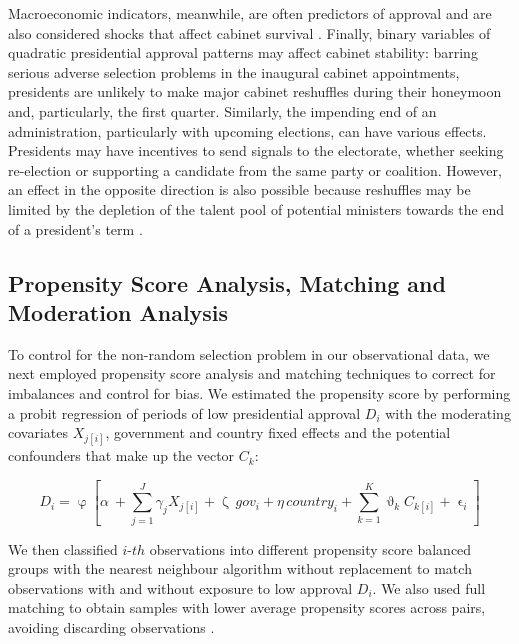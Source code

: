 \documentclass[12pt,halfline,a4paper]{ouparticle}
\begin{document}
Macroeconomic indicators, meanwhile, are often predictors of approval \citep{Carlin2018} and are also considered shocks that affect cabinet survival \citep{Camerlo2015a, MartinezGallardo2014}. Finally, binary variables of quadratic presidential approval patterns may affect cabinet stability: barring serious adverse selection problems in the inaugural cabinet appointments, presidents are unlikely to make major cabinet reshuffles during their honeymoon and, particularly, the first quarter. Similarly, the impending end of an administration, particularly with upcoming elections, can have various effects. Presidents may have incentives to send signals to the electorate, whether seeking re-election or supporting a candidate from the same party or coalition. However, an effect in the opposite direction is also possible because reshuffles may be limited by the depletion of the talent pool of potential ministers towards the end of a president’s term \citep[][see also \citeauthor{MartinezGallardo2015}, \citeyear{MartinezGallardo2015}]{Dewan2010}.

\subsection{Propensity Score Analysis, Matching and Moderation Analysis}
\label{sec3.3}

To control for the non-random selection problem in our observational data, we next employed propensity score analysis and matching techniques to correct for imbalances and control for bias. We estimated the propensity score by performing a probit regression of periods of low presidential approval $D_{i}$ with the moderating covariates $X_{j[i]}$, government and country fixed effects and the potential confounders that make up the vector $C_{k}$:

\begin{equation} \label{EQ2} 
D_{i} = \upvarphi \left[ \alpha\ + \sum_{j = 1}^{J} \gamma_{j}X_{j[i]} + \upzeta \, gov_{i} + \eta \, country_{i} +\sum_{k = 1}^{K} \upvartheta_{k}C_{k[i]} + \upvarepsilon_{i} \right]
\end{equation}

We then classified $i$-$th$ observations into different propensity score balanced groups with the nearest neighbour algorithm without replacement to match observations with and without exposure to low approval $D_{i}$. We also used full matching to obtain samples with lower average propensity scores across pairs, avoiding discarding observations \citep{Austin2015, Hansen2004, Olmos2015}.
\end{document}
